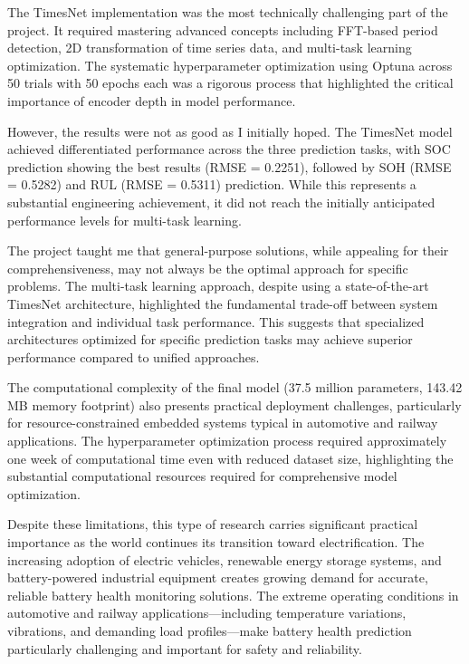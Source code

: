 The TimesNet implementation was the most technically challenging part of the project. It required mastering advanced concepts including FFT-based period detection, 2D transformation of time series data, and multi-task learning optimization. The systematic hyperparameter optimization using Optuna across 50 trials with 50 epochs each was a rigorous process that highlighted the critical importance of encoder depth in model performance.

However, the results were not as good as I initially hoped. The TimesNet model achieved differentiated performance across the three prediction tasks, with SOC prediction showing the best results (RMSE = 0.2251), followed by SOH (RMSE = 0.5282) and RUL (RMSE = 0.5311) prediction. While this represents a substantial engineering achievement, it did not reach the initially anticipated performance levels for multi-task learning.

The project taught me that general-purpose solutions, while appealing for their comprehensiveness, may not always be the optimal approach for specific problems. The multi-task learning approach, despite using a state-of-the-art TimesNet architecture, highlighted the fundamental trade-off between system integration and individual task performance. This suggests that specialized architectures optimized for specific prediction tasks may achieve superior performance compared to unified approaches.

The computational complexity of the final model (37.5 million parameters, 143.42 MB memory footprint) also presents practical deployment challenges, particularly for resource-constrained embedded systems typical in automotive and railway applications. The hyperparameter optimization process required approximately one week of computational time even with reduced dataset size, highlighting the substantial computational resources required for comprehensive model optimization.

Despite these limitations, this type of research carries significant practical importance as the world continues its transition toward electrification. The increasing adoption of electric vehicles, renewable energy storage systems, and battery-powered industrial equipment creates growing demand for accurate, reliable battery health monitoring solutions. The extreme operating conditions in automotive and railway applications—including temperature variations, vibrations, and demanding load profiles—make battery health prediction particularly challenging and important for safety and reliability.

